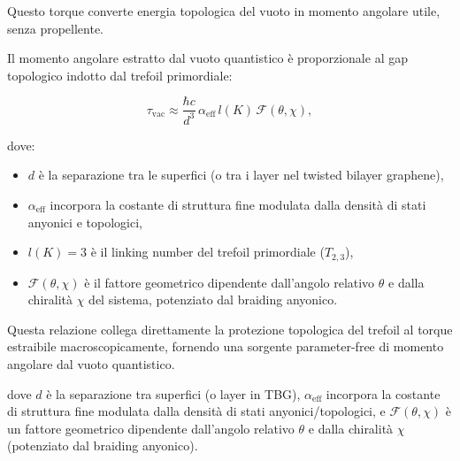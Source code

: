 \documentclass[11pt,a4paper]{article}
\theoremstyle{plain}
\theoremstyle{definition}
\begin{document}
\vspace{0.2cm}


Questo torque converte energia topologica del vuoto in momento angolare utile, senza propellente.


\vspace{0.4cm}

\begin{tcolorbox}[colback=cyan!5!white, 
                  colframe=cyan!70!black, 
                  title={Equazione chiave: Torque Casimir dal vuoto chirale mediato dal trefoil},
                  sharp corners,
                  boxrule=1.5pt,
                  fonttitle=\bfseries,
                  coltitle=white]
Il momento angolare estratto dal vuoto quantistico è proporzionale al gap topologico indotto dal trefoil primordiale:

\begin{equation}
\tau_{\text{vac}} \approx \frac{\hbar c}{d^3} \, \alpha_{\text{eff}} \, l(K) \, \mathcal{F}(\theta, \chi),
\label{eq:casimir_torque}
\end{equation}

dove:
\begin{itemize}
    \item \(d\) è la separazione tra le superfici (o tra i layer nel twisted bilayer graphene),
    \item \(\alpha_{\text{eff}}\) incorpora la costante di struttura fine modulata dalla densità di stati anyonici e topologici,
    \item \(l(K) = 3\) è il linking number del trefoil primordiale (\(T_{2,3}\)),
    \item \(\mathcal{F}(\theta, \chi)\) è il fattore geometrico dipendente dall'angolo relativo \(\theta\) e dalla chiralità \(\chi\) del sistema, potenziato dal braiding anyonico.
\end{itemize}

Questa relazione collega direttamente la protezione topologica del trefoil al torque estraibile macroscopicamente, fornendo una sorgente parameter-free di momento angolare dal vuoto quantistico.
\end{tcolorbox}
\vspace{0.2cm}

dove \(d\) è la separazione tra superfici (o layer in TBG), \(\alpha_{\text{eff}}\) incorpora la costante di struttura fine modulata dalla densità di stati anyonici/topologici, e \(\mathcal{F}(\theta, \chi)\) è un fattore geometrico dipendente dall'angolo relativo \(\theta\) e dalla chiralità \(\chi\) (potenziato dal braiding anyonico).
\end{document}
